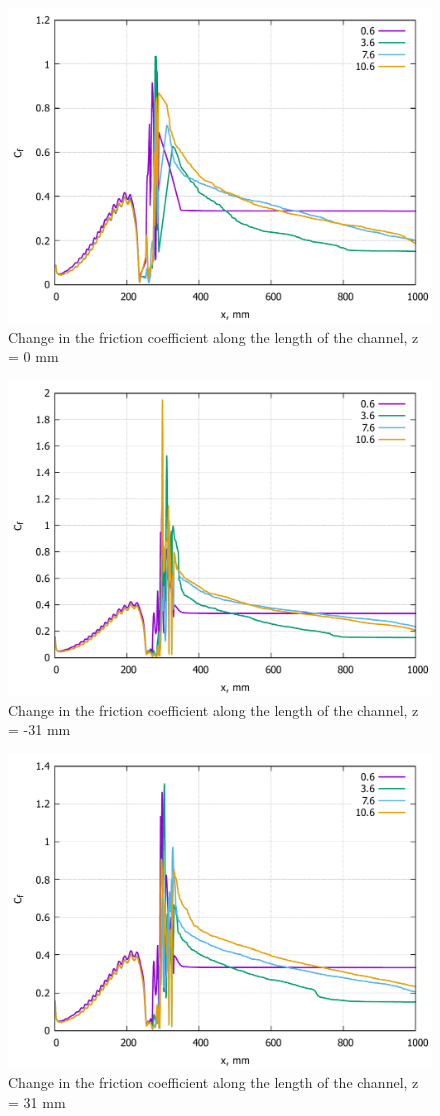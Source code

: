 	\begin{figure}[H]
		\centering
		\includegraphics[width=0.7\linewidth]{../Assets/Cf-Tall}
		\caption{Change in the friction coefficient along the length of the channel, z = 0 mm}
		\label{fig:cf-tall}
	\end{figure}
	\begin{figure}[H]
		\centering
		\includegraphics[width=0.7\linewidth]{../Assets/Cf-Tall-31m}
		\caption{Change in the friction coefficient along the length of the channel, z = -31 mm}
		\label{fig:cf-tall-31m}
	\end{figure}
	\begin{figure}[H]
		\centering
		\includegraphics[width=0.7\linewidth]{../Assets/Cf-Tall-31p}
		\caption{Change in the friction coefficient along the length of the channel, z = 31 mm}
		\label{fig:cf-tall-31p}
	\end{figure}
